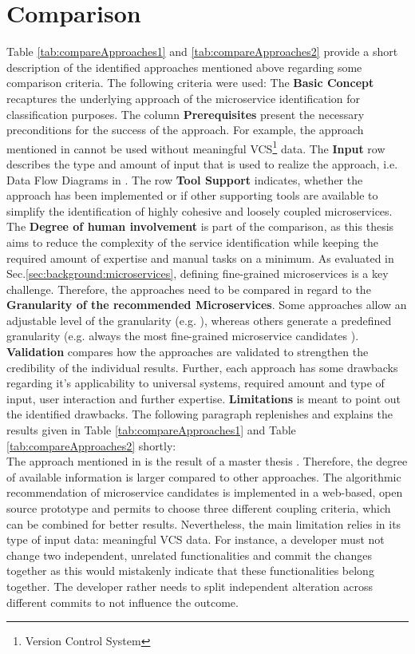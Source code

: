 \section{Comparison} 
\label{sec:stateOfTheArt:comparison}

Table \ref{tab:compareApproaches1} and \ref{tab:compareApproaches2} provide a short description of the identified approaches mentioned above regarding some comparison criteria. The following criteria were used: The \textbf{Basic Concept} recaptures the underlying approach of the microservice identification for classification purposes. The column \textbf{Prerequisites} present the necessary preconditions for the success of the approach. For example, the approach mentioned in \cite{ExtractionMazlami} cannot be used without meaningful VCS\footnote{Version Control System} data. The \textbf{Input} row describes the type and amount of input that is used to realize the approach, i.e. Data Flow Diagrams in \cite{DataflowDrivenChen}. The row \textbf{Tool Support} indicates, whether the approach has been implemented or if other supporting tools are available to simplify the identification of highly cohesive and loosely coupled microservices. The \textbf{Degree of human involvement} is part of the comparison, as this thesis aims to reduce the complexity of the service identification while keeping the required amount of expertise and manual tasks on a minimum. As evaluated in Sec.\ref{sec:background:microservices}, defining fine-grained microservices is a key challenge. Therefore, the approaches need to be compared in regard to the \textbf{Granularity of the recommended Microservices}. Some approaches allow an adjustable level of the granularity (e.g. \cite{ExtractionMazlami}), whereas others generate a predefined granularity (e.g. always the most fine-grained microservice candidates \cite{HeuristicsAlwis}). \textbf{Validation} compares how the approaches are validated to strengthen the credibility of the individual results. Further, each approach has some drawbacks regarding it's applicability to universal systems, required amount and type of input, user interaction and further expertise. \textbf{Limitations} is meant to point out the identified drawbacks. The following paragraph replenishes and explains the results given in Table \ref{tab:compareApproaches1} and Table \ref{tab:compareApproaches2} shortly: \\

\noindent
The approach mentioned in \cite{ExtractionMazlami} is the result of a master thesis \cite{Mazlami}. Therefore, the degree of available information is larger compared to other approaches. The algorithmic recommendation of microservice candidates is implemented in a web-based, open source prototype and permits to choose three different coupling criteria, which can be combined for better results. Nevertheless, the main limitation relies in its type of input data: meaningful VCS data. 
For instance, a developer must not change two independent, unrelated functionalities and commit the changes together as this would mistakenly indicate that these functionalities belong together. The developer rather needs to split independent alteration across different commits to not influence the outcome.\\


